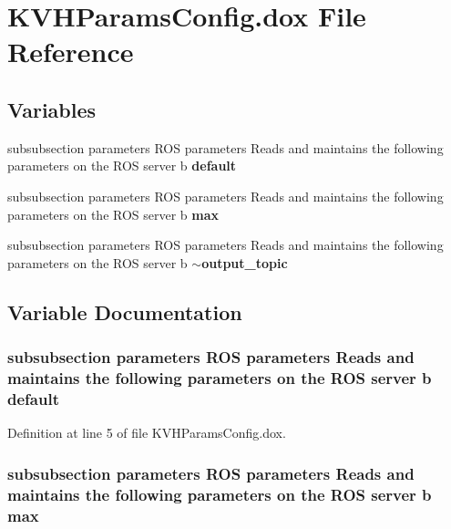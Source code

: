 \section{\-K\-V\-H\-Params\-Config.\-dox \-File \-Reference}
\label{KVHParamsConfig_8dox}
\subsection*{\-Variables}
\begin{DoxyCompactItemize}
\item 
subsubsection parameters \-R\-O\-S \*
parameters \-Reads and maintains \*
the following parameters on \*
the \-R\-O\-S server b {\bf default}
\item 
subsubsection parameters \-R\-O\-S \*
parameters \-Reads and maintains \*
the following parameters on \*
the \-R\-O\-S server b {\bf max}
\item 
subsubsection parameters \-R\-O\-S \*
parameters \-Reads and maintains \*
the following parameters on \*
the \-R\-O\-S server b {\bf $\sim$output\-\_\-topic}
\end{DoxyCompactItemize}


\subsection{\-Variable \-Documentation}
\subsubsection[{default}]{\setlength{\rightskip}{0pt plus 5cm}subsubsection parameters \-R\-O\-S parameters \-Reads and maintains the following parameters on the \-R\-O\-S server b {\bf default}}\label{KVHParamsConfig_8dox_a94d02332ecf13e7845f06fe8c343e101}


\-Definition at line 5 of file \-K\-V\-H\-Params\-Config.\-dox.

\subsubsection[{max}]{\setlength{\rightskip}{0pt plus 5cm}subsubsection parameters \-R\-O\-S parameters \-Reads and maintains the following parameters on the \-R\-O\-S server b {\bf max}}\label{KVHParamsConfig_8dox_a55c9de72d9f3630abdf51bfe39c191dd}


